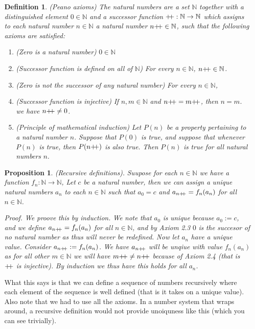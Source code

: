 \documentclass{article}
\newtheorem{definition}{Definition}[subsection]
\newtheorem{proposition}{Proposition}[subsection]
\newcommand{\N}{\mathbb{N}}
\newcommand{\pp}{\mathbin{+\mkern-5mu+}}
\begin{document}
\begin{definition}
	(Peano axioms) The natural numbers are a set $\N$ together with
	a distinguished element $0 \in \N$ and a successor function $\pp: \N \to \N$
	which assigns to each natural number $n \in \N$ a natural number $n\pp \in \N$,
	such that the following axioms are satisfied:

	\begin{enumerate}
		\item (Zero is a natural number) $0 \in \N$
		\item (Successor function is defined on all of $\N$) For every $n \in \N$, $n\pp \in \N$.
		\item (Zero is not the successor of any natural number) For every $n \in \N$,
		\item (Successor function is injective) If $n,m \in \N$ and $n\pp = m\pp$,
			then $n = m$.
			we have $n\pp \neq 0$.
		\item (Principle of mathematical induction) Let $P(n)$ be a property 
			pertaining to a natural number $n$. Suppose that $P(0)$ is true, and 
			suppose that whenever $P(n)$ is true, then $P(n\pp)$ is also true. 
			Then $P(n)$ is true for all natural numbers $n$.
	\end{enumerate}
\end{definition}

\begin{proposition}
	(Recursive definitions). Suupose for each $n \in \N$ we have 
	a function $f_n : \N \to \N$, Let $c$ be a natural number, 
	then we can assign a unique natural numbers $a_n$ to each $n \in \N$
	such that $a_0 = c$ and $a_{n\pp} = f_n(a_n)$ for all $n \in \N$.


	Proof. We proove this by induction. We note that $a_0$ is unique 
	because $a_0 := c$, and we define $a_{n\pp} = f_n(a_n)$ for all $n \in \N$,
	and by Axiom 2.3 $0$ is the succesor of no natural number as thus 
	will never be redefined. Now let $a_n$ have a unique value. Consider 
	$a_{n\pp} := f_n(a_n)$. We have $a_{n\pp}$ will be unqiue with 
	value $f_n(a_n)$ as for all other $m \in \N$ we will have 
	$m\pp  \neq n\pp$ because of Axiom 2.4 (that is $\pp$ is injective).
	By induction we thus have this holds for all $a_n$.
\end{proposition}

What this says is that we can define a sequence of numbers recursively where 
each element of the sequence is well defined (that is it takes 
on  a unique value). Also note that we had to use all the axioms. In a 
number system that wraps around, a recursive definition would 
not provide unoiquness like this (which you can see trivially).
\end{document}
